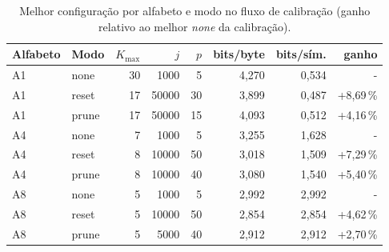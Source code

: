 \begin{table}[H]
\centering
\setlength{\tabcolsep}{5pt}
\caption{Melhor configuração por alfabeto e modo no fluxo de calibração (ganho relativo ao melhor \emph{none} da calibração).}
\label{tab:resumo-31}
\begin{tabular}{llrrrrrr}
\toprule
Alfabeto & Modo & $K_{\max}$ & $j$ & $p$ & bits/byte & bits/sím. & ganho \\
\midrule
A1 & none & 30 & 1000 & 5 & 4,270 & 0,534 & - \\
A1 & reset & 17 & 50000 & 30 & 3,899 & 0,487 & +8,69\,\% \\
A1 & prune & 17 & 50000 & 15 & 4,093 & 0,512 & +4,16\,\% \\
\midrule
A4 & none & 7 & 1000 & 5 & 3,255 & 1,628 & - \\
A4 & reset & 8 & 10000 & 50 & 3,018 & 1,509 & +7,29\,\% \\
A4 & prune & 8 & 10000 & 40 & 3,080 & 1,540 & +5,40\,\% \\
\midrule
A8 & none & 5 & 1000 & 5 & 2,992 & 2,992 & - \\
A8 & reset & 5 & 10000 & 50 & 2,854 & 2,854 & +4,62\,\% \\
A8 & prune & 5 & 5000 & 40 & 2,912 & 2,912 & +2,70\,\% \\
\bottomrule
\end{tabular}
\end{table}
